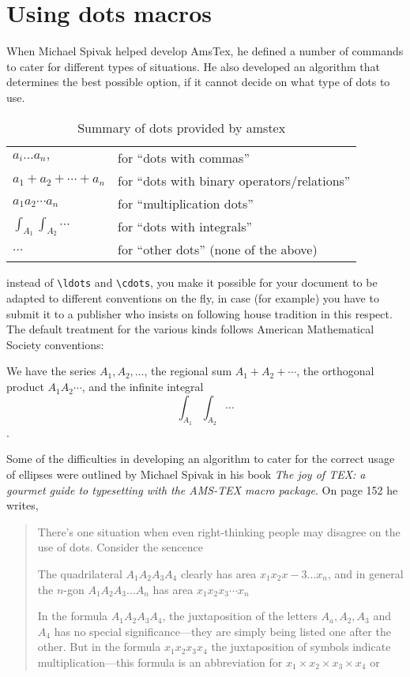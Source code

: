 


\section{Using dots macros}

When Michael Spivak helped develop AmsTex, he defined a number of commands to cater for different types of situations. He also developed an algorithm that determines the best possible option, if it cannot decide on what type of dots to use.

\begin{table}[htbp]
\begin{tabular}{ll}
\toprule
$a_i\dotsc a_n,$ & for ``dots with commas''\\
$a_1+a_2+\dotsb+a_n$ &for “dots with binary operators/relations”\\
$a_1a_2\dotsm a_n$ &for ``multiplication dots''\\
$\int_{A_1}\int_{A_2}\dotsi$ &for ``dots with integrals''\\
$\dotso$ &for “other dots” (none of the above)\\
\bottomrule
\end{tabular}
\caption{Summary of dots provided by amstex}
\end{table}

instead of \verb+\ldots+ and \verb+\cdots+, you make it possible for your document to be adapted to
different conventions on the fly, in case (for example) you have to submit it to a publisher who insists on following house tradition in this respect. The default treatment for the various kinds follows American Mathematical Society conventions:

{
We have the series $A_1,A_2,\dotsc$,
the regional sum $A_1+A_2+\dotsb$,
the orthogonal product $A_1A_2\dotsm$,
and the infinite integral
\[\int_{A_1}\int_{A_2}\dotsi\].}


Some of the difficulties in developing an algorithm to cater for the correct usage of ellipses were outlined by Michael Spivak in his book \textit{The joy of TEX: a gourmet guide to typesetting with the AMS-TEX macro package}. On page 152 he writes,

\begin{quotation}
\normalsize
There's one situation when even right-thinking people may disagree on the use of dots. Consider the sencence


  The quadrilateral \(A_1A_2A_3A_4\) clearly has area \(x_1x_2x-3\ldots x_n\), and in general the $n$-gon $A_1A_2A_3 \ldots A_n$ has area $x_1x_2x_3\cdots x_n$


In the formula $A_1A_2A_3A_4$,  the juxtaposition of the letters $A_a, A_2, A_3$ and $A_4$ has no special significance---they are simply being listed one after the other. But in the formula $x_1x_2x_3x_4$ the juxtaposition of symbols indicate multiplication---this formula is an abbreviation for $x_1\times x_2\times x_3\times x_4$ or

\end{quotation}

